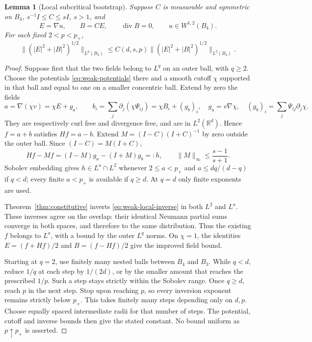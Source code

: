 \documentclass[11pt,a4paper]{article}
\numberwithin{equation}{section}
\newtheorem{lemma}[theorem]{Lemma}
\theoremstyle{definition}
\theoremstyle{remark}\newtheorem{remark}[theorem]{Remark}
\DeclareMathOperator{\diver}{div}
\newcommand{\R}{\mathbb R}
\newcommand{\Id}{I}
\newcommand{\norm}[1]{\lVert #1\rVert}
\begin{document}
\begin{lemma}[Local subcritical bootstrap]\label{lem:local-bootstrap}
Suppose \(C\) is measurable and symmetric on \(B_4\),
\(s^{-1}\Id\leq C\leq s\Id\), \(s>1\), and
\[
 E=\nabla u,\qquad B=CE,\qquad \diver B=0,\qquad u\in W^{1,2}(B_4).
\]
For each fixed \(2<p<p_+\),
\[
 \norm{(|E|^2+|B|^2)^{1/2}}_{L^p(B_3)}
 \leq C(d,s,p)\norm{(|E|^2+|B|^2)^{1/2}}_{L^2(B_4)}.
\]
\end{lemma}
\begin{proof}
Suppose first that the two fields belong to \(L^q\) on an outer
ball, with \(q\geq2\). Choose the potentials
\eqref{eq:weak-potentials} there and a smooth cutoff \(\chi\) supported
in that ball and equal to one on a smaller concentric ball. Extend
by zero the fields
\[
 a=\nabla(\chi v)=\chi E+g_a,\qquad
 b_i=\sum_j\partial_j(\chi\Psi_{ij})=\chi B_i+(g_b)_i,
 \quad g_a=v\nabla\chi,\quad (g_b)_i=\sum_j\Psi_{ij}\partial_j\chi .
\]
They are respectively curl free and divergence free, and are in
\(L^2(\R^d)\). Hence \(f=a+b\) satisfies \(Hf=a-b\).
Extend \(M=(\Id-C)(\Id+C)^{-1}\) by zero outside the outer ball.
Since \((\Id-C)=M(\Id+C)\),
\begin{equation}\label{eq:weak-local-inverse}
 Hf-Mf=(\Id-M)g_a-(\Id+M)g_b=:h,\qquad
 \norm M_\infty\leq\frac{s-1}{s+1}.
\end{equation}
Sobolev embedding gives \(h\in L^a\cap L^2\) whenever
\(2\leq a<p_+\) and \(a\leq dq/(d-q)\) if \(q<d\);
every finite \(a<p_+\) is available if \(q\geq d\).
At \(q=d\) only finite exponents are used.

Theorem~\ref{thm:constitutive} inverts \eqref{eq:weak-local-inverse}
in both \(L^2\) and \(L^a\). These inverses agree on the overlap:
their identical Neumann partial sums converge in both spaces, and
therefore to the same distribution. Thus the existing \(f\) belongs
to \(L^a\), with a bound by the outer \(L^q\) norms.
On \(\chi=1\), the identities \(E=(f+Hf)/2\) and
\(B=(f-Hf)/2\) give the improved field bound.

Starting at \(q=2\), use finitely many nested balls between \(B_4\)
and \(B_3\). While \(q<d\), reduce \(1/q\) at each step by
\(1/(2d)\), or by the smaller amount that reaches the prescribed
\(1/p\). Such a step stays strictly within the Sobolev range.
Once \(q\geq d\), reach \(p\) in the next step.
Stop upon reaching \(p\), so every inversion exponent remains
strictly below \(p_+\). This takes finitely many steps depending
only on \(d,p\). Choose equally spaced intermediate radii for that
number of steps. The potential, cutoff and inverse bounds then
give the stated constant. No bound uniform as \(p\uparrow p_+\)
is asserted.
\end{proof}
\end{document}
